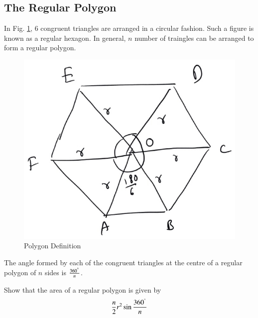 \subsection{The Regular Polygon}
%

\begin{definition}
	In Fig. \ref{ch5_polygon_def}, 6 congruent triangles are arranged in a circular fashion.  Such a figure is known as a regular hexagon.  In general, $n$ number of traingles can be arranged to form a regular polygon.
\end{definition}
\begin{figure}[!h]
	\begin{center}
		
		\includegraphics[width=\columnwidth]{./figs/ch5_polygon_def}
		\vspace*{-10cm}
	\end{center}
	\caption{Polygon Definition}
	\label{ch5_polygon_def}	
\end{figure}
%
\begin{definition}
The angle formed by each of the congruent triangles at the centre of a regular polygon of $n$ sides is $\frac{360^{\degree}}{n}$.
\end{definition}
%
\begin{problem}
Show that the area of a regular polygon is given by 
%
\begin{equation}
\frac{n}{2}r^{2}\sin\frac{360^{\degree}}{n}
\end{equation}
%
\end{problem}
